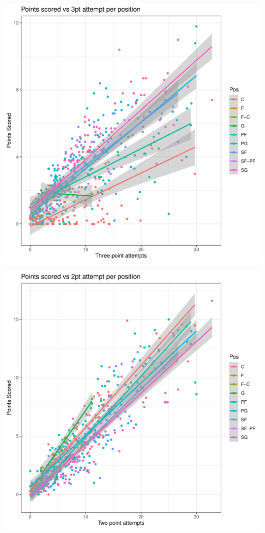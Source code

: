 \documentclass[
]{article}
\begin{document}
\begin{center}\includegraphics{./figures/unnamed-chunk-3-1} \end{center}

\begin{center}\includegraphics{./figures/unnamed-chunk-3-2} \end{center}
\end{document}
